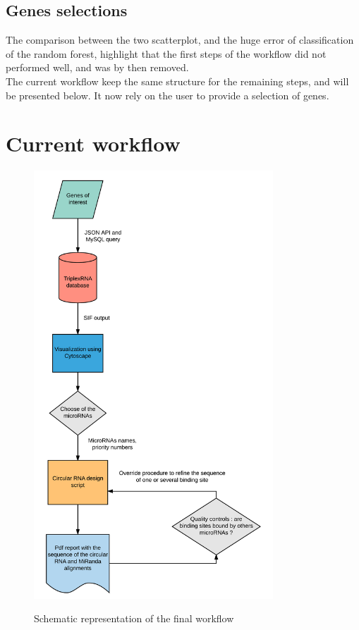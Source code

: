 \documentclass[a4paper,12pt]{report}
\begin{document}
\subsection{Genes selections}

The comparison between the two scatterplot, and the huge error of classification of the random forest, highlight that the first steps of the workflow did not performed well, and was by then removed. \\

The current workflow keep the same structure for the remaining steps, and will be presented below. It now rely on the user to provide a selection of genes.\\

\section{Current workflow}

\begin{figure}[H]
	\centering
	{\includegraphics[width=0.8\textwidth]{Final_Workflow.png}}
	\caption{Schematic representation of the final workflow}
\end{figure}
\end{document}
